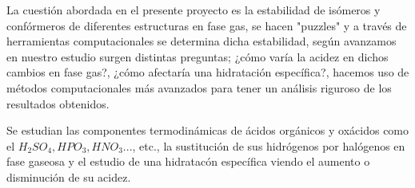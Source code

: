 La cuestión abordada en el presente proyecto es la estabilidad de isómeros y confórmeros de diferentes estructuras en fase gas, se hacen "puzzles" y a través de herramientas computacionales se determina dicha estabilidad, según avanzamos en nuestro estudio surgen distintas preguntas; ¿cómo varía la acidez en dichos cambios en fase gas?, ¿cómo afectaría una hidratación específica?, hacemos uso de métodos computacionales más avanzados para tener un análisis riguroso de los resultados obtenidos.

Se estudian las componentes termodinámicas de ácidos orgánicos y oxácidos como el $H_2SO_4, HPO_3, HNO_3...$, etc., la sustitución de sus hidrógenos por halógenos en fase gaseosa \cite{quimica3} y el estudio de una hidratacón específica viendo el aumento o disminución de su acidez.
